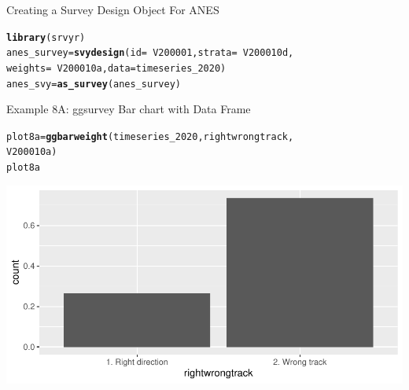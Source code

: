 \documentclass{beamer}\usepackage[]{graphicx}\usepackage[]{color}
\makeatletter
\newcommand{\hlopt}[1]{\textcolor[rgb]{0,0,0}{#1}}%
\newcommand{\hlstd}[1]{\textcolor[rgb]{0.345,0.345,0.345}{#1}}%
\newcommand{\hlkwb}[1]{\textcolor[rgb]{0.69,0.353,0.396}{#1}}%
\newcommand{\hlkwc}[1]{\textcolor[rgb]{0.333,0.667,0.333}{#1}}%
\newcommand{\hlkwd}[1]{\textcolor[rgb]{0.737,0.353,0.396}{\textbf{#1}}}%
\newenvironment{kframe}{%
 \def\at@end@of@kframe{}%
 \ifinner\ifhmode%
  \def\at@end@of@kframe{\end{minipage}}%
  \begin{minipage}{\columnwidth}%
 \fi\fi%
 \def\FrameCommand##1{\hskip\@totalleftmargin \hskip-\fboxsep
 \colorbox{shadecolor}{##1}\hskip-\fboxsep
     \hskip-\linewidth \hskip-\@totalleftmargin \hskip\columnwidth}%
 \MakeFramed {\advance\hsize-\width
   \@totalleftmargin\z@ \linewidth\hsize
   \@setminipage}}%
 {\par\unskip\endMakeFramed%
 \at@end@of@kframe}
\newenvironment{knitrout}{}{} %
\makeatother
\begin{document}
\begin{frame}[fragile]{Creating a Survey Design Object For ANES}
\begin{knitrout}
\color{fgcolor}\begin{kframe}
\begin{alltt}
\hlkwd{library}\hlstd{(srvyr)}
\hlstd{anes_survey} \hlkwb{=} \hlkwd{svydesign}\hlstd{(}\hlkwc{id} \hlstd{=} \hlopt{~}\hlstd{V200001,} \hlkwc{strata} \hlstd{=} \hlopt{~}\hlstd{V200010d,}
    \hlkwc{weights} \hlstd{=} \hlopt{~}\hlstd{V200010a,} \hlkwc{data} \hlstd{= timeseries_2020)}
\hlstd{anes_svy} \hlkwb{=} \hlkwd{as_survey}\hlstd{(anes_survey)}
\end{alltt}
\end{kframe}
\end{knitrout}
\end{frame}

\begin{frame}[fragile]{Example 8A: ggsurvey Bar chart with Data Frame}
\begin{knitrout}
\color{fgcolor}\begin{kframe}
\begin{alltt}
\hlstd{plot8a} \hlkwb{=} \hlkwd{ggbarweight}\hlstd{(timeseries_2020, rightwrongtrack,}
    \hlstd{V200010a)}
\hlstd{plot8a}
\end{alltt}
\end{kframe}
\includegraphics[width=0.95\linewidth]{figure/unnamed-chunk-31-1} 
\end{knitrout}

\end{frame}
\end{document}
